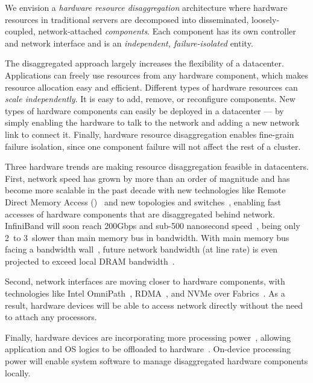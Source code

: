 \documentclass[10pt,times,twocolumn]{z2-article}
\begin{document}
We envision a {\em hardware resource disaggregation} architecture 
where hardware resources in traditional servers are decomposed into disseminated, loosely-coupled, network-attached {\em components}.
Each component has its own controller and network interface
and is an {\em independent, failure-isolated} entity.

The disaggregated approach largely increases the flexibility of a datacenter.
Applications can freely use resources from any hardware component,
which makes resource allocation easy and efficient.
Different types of hardware resources can {\em scale independently}.
It is easy to add, remove, or reconfigure components.
New types of hardware components can easily be deployed in a datacenter ---
by simply enabling the hardware to talk to the network and adding a new network link to connect it.
Finally, hardware resource disaggregation enables fine-grain failure isolation, %
since one component failure will not affect the rest of a cluster.

Three hardware trends are making resource disaggregation feasible in datacenters.
First, network speed has grown by more than an order of magnitude and has become more scalable in the past decade %
with new technologies like Remote Direct Memory Access ({\em \rdma})~\cite{ibverbs} 
and new topologies and switches~\cite{FireBox-FASTKeynote,costa15-r2c2,Costa-WRSC14},
enabling fast accesses of hardware components that are disaggregated behind network.
InfiniBand will soon reach 200Gbps and sub-500 nanosecond speed~\cite{Mellanox-ConnectX6,Mellanox-ConnectX6-IB,Mellanox-Switch},
being only 2\x\ to 3\x\ slower than main memory bus in bandwidth.
With main memory bus facing a bandwidth wall~\cite{BW-Wall-ISCA09},
future network bandwidth (at line rate) is even projected to exceed local DRAM bandwidth~\cite{CacheCloud-hotcloud18}.

Second, network interfaces are moving closer to hardware components,
with technologies like Intel OmniPath~\cite{OmniPath},
RDMA~\cite{ibverbs},
and NVMe over Fabrics~\cite{NVMe-fabrics-Inteltalk,NVMe-fabrics}.
As a result, hardware devices will be able to access network directly 
without the need to attach any processors. 

Finally, hardware devices are incorporating more processing power~\cite{Ahn15-PIM,Bojnordi12,Mellanox-SmartNIC,Mellanox-SmartNIC2,Agilio-SmartNIC,Junwhan-ISCA17},
allowing application and OS logics to be offloaded to hardware~\cite{Willow,Kaufmann16-ASPLOS}.
On-device processing power will enable system software to manage disaggregated hardware components locally.
\end{document}
